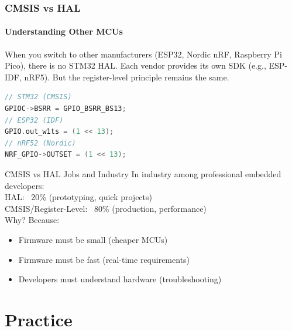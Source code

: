 \documentclass{beamer}
\begin{document}
\begin{frame}[fragile]
	\frametitle{CMSIS vs HAL}
	\framesubtitle{Understanding Other MCUs}
	When you switch to other manufacturers (ESP32, Nordic nRF, Raspberry Pi Pico),	there is no STM32 HAL. Each vendor provides its own SDK (e.g., ESP-IDF, nRF5).
	But the register-level principle remains the same.
	\begin{lstlisting}[language=C]
// STM32 (CMSIS)
GPIOC->BSRR = GPIO_BSRR_BS13;
// ESP32 (IDF)
GPIO.out_w1ts = (1 << 13);
// nRF52 (Nordic)
NRF_GPIO->OUTSET = (1 << 13);
	\end{lstlisting}
\end{frame}
\begin{frame}{CMSIS vs HAL}
	{Jobs and Industry}
	In industry among professional embedded developers:\\
	\vspace{0.2cm}
	HAL: ~20\% (prototyping, quick projects)\\
	CMSIS/Register-Level: ~80\% (production, performance)\\
	\vspace{0.2cm}
	Why? Because:
	\begin{itemize}
		\item Firmware must be small (cheaper MCUs)
		\item Firmware must be fast (real-time requirements)
		\item Developers must understand hardware (troubleshooting)
	\end{itemize}
\end{frame}
\section{Practice}
\end{document}
